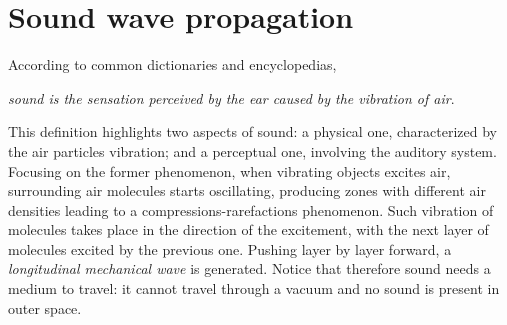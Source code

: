 \section{Sound wave propagation}\label{ch:acoustics:sec:wave}%
According to common dictionaries and encyclopedias,
\begin{center}
    \textit{sound is the sensation perceived by the ear caused by the vibration of air}.
\end{center}
This definition highlights two aspects of sound: a physical one, characterized by the air particles vibration; and a perceptual one, involving the auditory system.
Focusing on the former phenomenon, when vibrating objects excites air, surrounding air molecules starts oscillating,
producing zones with different air densities leading to a compressions-rarefactions phenomenon.
Such vibration of molecules takes place in the direction of the excitement, with the next layer of molecules excited by the previous one.
Pushing layer by layer forward, a \textit{longitudinal mechanical wave} is generated.
Notice that therefore sound needs a medium to travel: it cannot travel through a vacuum and no sound is present in outer space.

